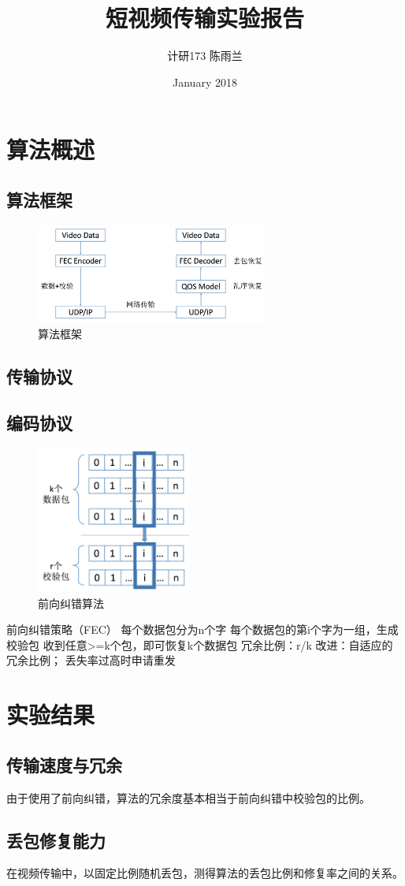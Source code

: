 \documentclass[twocolumn]{article}
\title{短视频传输实验报告}
\author{计研173 \quad 陈雨兰 \quad 2017310787}
\date{January 2018}
\begin{document}
\begin{CJK*}{UTF8}{gbsn}

\maketitle

\section{算法概述}
\subsection{算法框架}
\begin{figure}[h]
	\centering
	\includegraphics[width=3in]{frame.jpg}
	\caption{算法框架}
	\label{fig:frame}
\end{figure}

\subsection{传输协议}

\subsection{编码协议}
\begin{figure}[h]
	\centering
	\includegraphics[width=2in]{FEC.jpg}
	\caption{前向纠错算法}
	\label{fig:FEC}
\end{figure}

前向纠错策略（FEC）
每个数据包分为n个字
每个数据包的第i个字为一组，生成校验包
收到任意>=k个包，即可恢复k个数据包
冗余比例：r/k
改进：自适应的冗余比例；
丢失率过高时申请重发


\section{实验结果}
\subsection{传输速度与冗余}
由于使用了前向纠错，算法的冗余度基本相当于前向纠错中校验包的比例。
\subsection{丢包修复能力}
在视频传输中，以固定比例随机丢包，测得算法的丢包比例和修复率之间的关系。

\end{CJK*}
\end{document}
